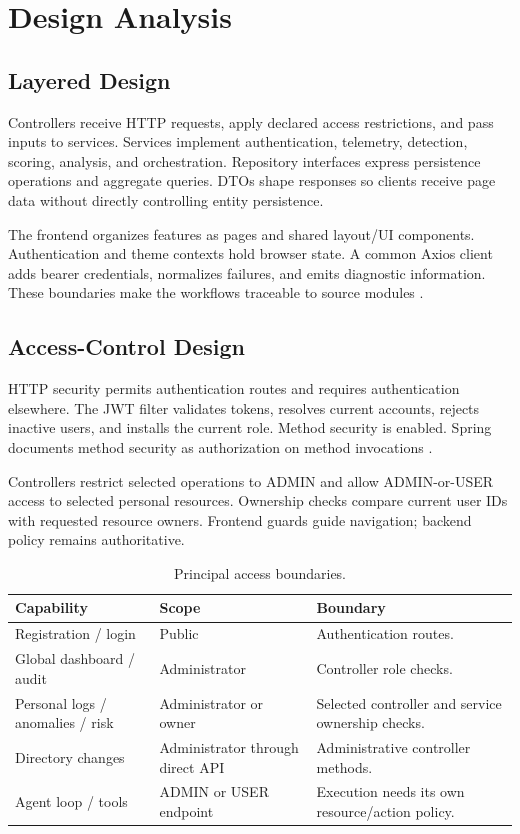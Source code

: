 \chapter{Design Analysis}
\section{Layered Design}
Controllers receive HTTP requests, apply declared access restrictions, and pass inputs to services. Services implement authentication, telemetry, detection, scoring, analysis, and orchestration. Repository interfaces express persistence operations and aggregate queries. DTOs shape responses so clients receive page data without directly controlling entity persistence.

The frontend organizes features as pages and shared layout/UI components. Authentication and theme contexts hold browser state. A common Axios client adds bearer credentials, normalizes failures, and emits diagnostic information. These boundaries make the workflows traceable to source modules \cite{repo}.



\section{Access-Control Design}
HTTP security permits authentication routes and requires authentication elsewhere. The JWT filter validates tokens, resolves current accounts, rejects inactive users, and installs the current role. Method security is enabled. Spring documents method security as authorization on method invocations \cite{spring}.

Controllers restrict selected operations to ADMIN and allow ADMIN-or-USER access to selected personal resources. Ownership checks compare current user IDs with requested resource owners. Frontend guards guide navigation; backend policy remains authoritative.
\begin{table}[htbp]\centering\small\caption{Principal access boundaries.}
\begin{tabularx}{\textwidth}{YYY}\toprule Capability & Scope & Boundary\\\midrule
Registration / login & Public & Authentication routes.\\
Global dashboard / audit & Administrator & Controller role checks.\\
Personal logs / anomalies / risk & Administrator or owner & Selected controller and service ownership checks.\\
Directory changes & Administrator through direct API & Administrative controller methods.\\
Agent loop / tools & ADMIN or USER endpoint & Execution needs its own resource/action policy.\\\bottomrule\end{tabularx}\end{table}


